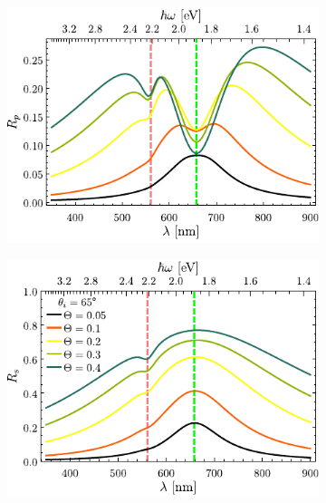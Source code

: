 		\begin{figure}[h!]\centering\hspace*{-1.5em}
	\begin{subfigure}{.01\linewidth}\caption{}\label{sfig:FSM-cutp}\vspace{4.75cm}\end{subfigure}
	\begin{subfigure}{.45\linewidth}\hspace*{-2em}
	\includegraphics[scale=.98]{2-Resultados/figs/4-Wp4FSMThetaVar/cut_angle_65_p.pdf}\end{subfigure}
	\begin{subfigure}{.01\linewidth}\caption{}\label{sfig:FSM-cuts}\vspace{4.75cm}\end{subfigure}\hspace*{-1.em}
	\begin{subfigure}{.45\linewidth}\centering
	\includegraphics[scale=.98 ]{2-Resultados/figs/4-Wp4FSMThetaVar/cut_angle_65_s.pdf}\end{subfigure}\vspace*{-.5em}

\end{figure}
